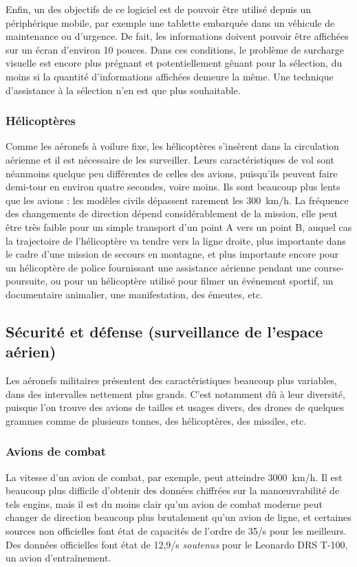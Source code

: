 	Enfin, un des objectifs de ce logiciel est de pouvoir être utilisé depuis un périphérique mobile, par exemple une tablette embarquée dans un véhicule de maintenance ou d'urgence. De fait, les informations doivent pouvoir être affichées sur un écran d'environ 10 pouces. Dans ces conditions, le problème de surcharge visuelle est encore plus prégnant et potentiellement gênant pour la sélection, du moins si la quantité d'informations affichées demeure la même. Une technique d'assistance à la sélection n'en est que plus souhaitable.

	\subsubsection{Hélicoptères}
	Comme les aéronefs à voilure fixe, les hélicoptères s'insèrent dans la circulation aérienne et il est nécessaire de les surveiller. Leurs caractéristiques de vol sont néanmoins quelque peu différentes de celles des avions, puisqu'ils peuvent faire demi-tour en environ quatre secondes, voire moins. Ils sont beaucoup plus lents que les avions : les modèles civils dépassent rarement les 300~km/h. La fréquence des changements de direction dépend considérablement de la mission, elle peut être très faible pour un simple transport d'un point A vers un point B, auquel cas la trajectoire de l'hélicoptère va tendre vers la ligne droite, plus importante dans le cadre d'une mission de secours en montagne, et plus importante encore pour un hélicoptère de police fournissant une assistance aérienne pendant une course-poursuite, ou pour un hélicoptère utilisé pour filmer un événement sportif, un documentaire animalier, une manifestation, des émeutes, etc.
	
	\FloatBarrier \subsection{Sécurité et défense (surveillance de l'espace aérien)}
	Les aéronefs militaires présentent des caractéristiques beaucoup plus variables, dans des intervalles nettement plus grands. C'est notamment dû à leur diversité, puisque l'on trouve des avions de tailles et usages divers, des drones de quelques grammes comme de plusieurs tonnes, des hélicoptères, des missiles, etc.
	
	\subsubsection{Avions de combat}
	La vitesse d'un avion de combat, par exemple, peut atteindre 3000~km/h\footnotemark. Il est beaucoup plus difficile d'obtenir des données chiffrées sur la manœuvrabilité de tels engins, mais il est du moins clair qu'un avion de combat moderne peut changer de direction beaucoup plus brutalement qu'un avion de ligne, et certaines sources non officielles font état de capacités de l'ordre de 35\textdegree{}/s pour les meilleurs\footnotemark. Des données officielles font état de 12,9\textdegree{}/s \emph{soutenus} pour le Leonardo DRS T-100, un avion d'entraînement\footnotemark.
	

